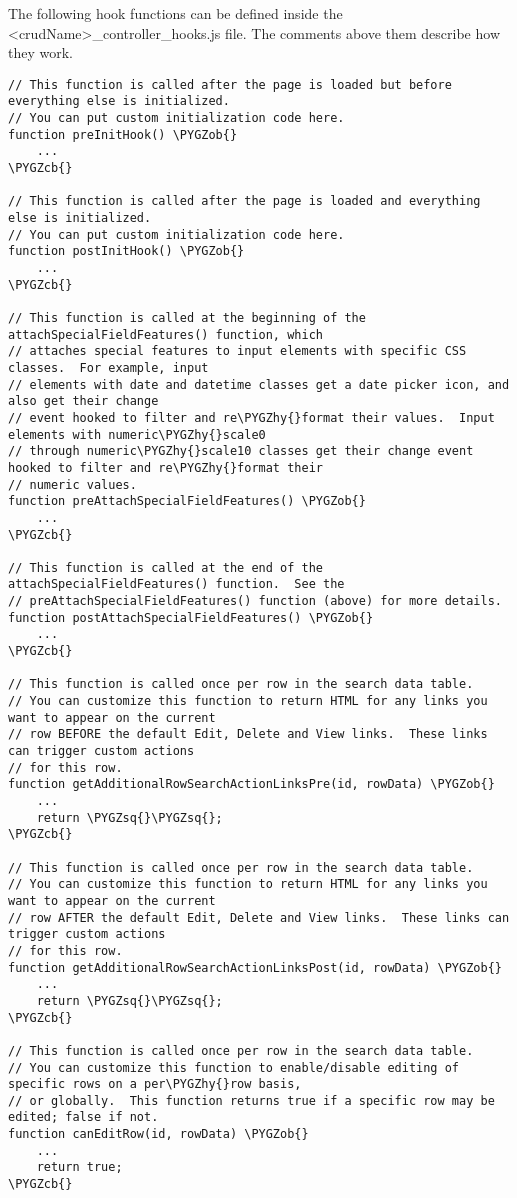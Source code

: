 \documentclass[letterpaper,10pt,english]{sphinxmanual}
\def\PYGZob{\char`\{}
\def\PYGZcb{\char`\}}
\def\PYGZhy{\char`\-}
\def\PYGZsq{\char`\'}
\renewcommand\PYGZsq{\textquotesingle}
\begin{document}
The following hook functions can be defined inside the \textless{}crudName\textgreater{}\_controller\_hooks.js file.
The comments above them describe how they work.

\begin{Verbatim}[commandchars=\\\{\}]
// This function is called after the page is loaded but before everything else is initialized.
// You can put custom initialization code here.
function preInitHook() \PYGZob{}
    ...
\PYGZcb{}

// This function is called after the page is loaded and everything else is initialized.
// You can put custom initialization code here.
function postInitHook() \PYGZob{}
    ...
\PYGZcb{}

// This function is called at the beginning of the attachSpecialFieldFeatures() function, which
// attaches special features to input elements with specific CSS classes.  For example, input
// elements with date and datetime classes get a date picker icon, and also get their change
// event hooked to filter and re\PYGZhy{}format their values.  Input elements with numeric\PYGZhy{}scale0
// through numeric\PYGZhy{}scale10 classes get their change event hooked to filter and re\PYGZhy{}format their
// numeric values.
function preAttachSpecialFieldFeatures() \PYGZob{}
    ...
\PYGZcb{}

// This function is called at the end of the attachSpecialFieldFeatures() function.  See the
// preAttachSpecialFieldFeatures() function (above) for more details.
function postAttachSpecialFieldFeatures() \PYGZob{}
    ...
\PYGZcb{}

// This function is called once per row in the search data table.
// You can customize this function to return HTML for any links you want to appear on the current
// row BEFORE the default Edit, Delete and View links.  These links can trigger custom actions
// for this row.
function getAdditionalRowSearchActionLinksPre(id, rowData) \PYGZob{}
    ...
    return \PYGZsq{}\PYGZsq{};
\PYGZcb{}

// This function is called once per row in the search data table.
// You can customize this function to return HTML for any links you want to appear on the current
// row AFTER the default Edit, Delete and View links.  These links can trigger custom actions
// for this row.
function getAdditionalRowSearchActionLinksPost(id, rowData) \PYGZob{}
    ...
    return \PYGZsq{}\PYGZsq{};
\PYGZcb{}

// This function is called once per row in the search data table.
// You can customize this function to enable/disable editing of specific rows on a per\PYGZhy{}row basis,
// or globally.  This function returns true if a specific row may be edited; false if not.
function canEditRow(id, rowData) \PYGZob{}
    ...
    return true;
\PYGZcb{}


\end{Verbatim}
\end{document}
